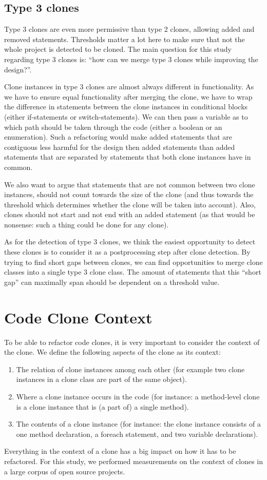 \documentclass[a4paper]{article}
\begin{document}
\subsection{Type 3 clones}
Type 3 clones are even more permissive than type 2 clones, allowing added and removed statements. Thresholds matter a lot here to make sure that not the whole project is detected to be cloned. The main question for this study regarding type 3 clones is: ``how can we merge type 3 clones while improving the design?''.

Clone instances in type 3 clones are almost always different in functionality. As we have to ensure equal functionality after merging the clone, we have to wrap the difference in statements between the clone instances in conditional blocks (either if-statements or switch-statements). We can then pass a variable as to which path should be taken through the code (either a boolean or an enumeration). Such a refactoring would make added statements that are contiguous less harmful for the design then added statements than added statements that are separated by statements that both clone instances have in common.

We also want to argue that statements that are not common between two clone instances, should not count towards the size of the clone (and thus towards the threshold which determines whether the clone will be taken into account). Also, clones should not start and not end with an added statement (as that would be nonsense: such a thing could be done for any clone).

As for the detection of type 3 clones, we think the easiest opportunity to detect these clones is to consider it as a postprocessing step after clone detection. By trying to find short gaps between clones, we can find opportunities to merge clone classes into a single type 3 clone class. The amount of statements that this ``short gap'' can maximally span should be dependent on a threshold value.

\section{Code Clone Context}
To be able to refactor code clones, it is very important to consider the context of the clone. We define the following aspects of the clone as its context:
\begin{enumerate}
  \item The relation of clone instances among each other (for example two clone instances in a clone class are part of the same object).
  \item Where a clone instance occurs in the code (for instance: a method-level clone is a clone instance that is (a part of) a single method).
  \item The contents of a clone instance (for instance: the clone instance consists of a one method declaration, a foreach statement, and two variable declarations).
\end{enumerate}
Everything in the context of a clone has a big impact on how it has to be refactored. For this study, we performed measurements on the context of clones in a large corpus of open source projects.
\end{document}
